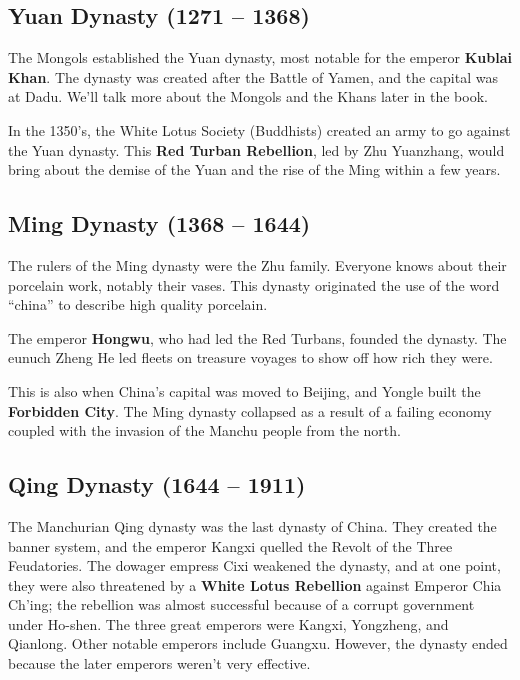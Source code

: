 \subsection*{Yuan Dynasty (1271 -- 1368)}

The Mongols established the Yuan dynasty, most notable for the emperor \textbf{Kublai Khan}.
The dynasty was created after the Battle of Yamen, and the capital was at Dadu.
We'll talk more about the Mongols and the Khans later in the book.

In the 1350's, the White Lotus Society (Buddhists) created an army to go against the Yuan dynasty.
This \textbf{Red Turban Rebellion}, led by Zhu Yuanzhang,
would bring about the demise of the Yuan and the rise of the Ming within a few years.

\subsection*{Ming Dynasty (1368 -- 1644)}

The rulers of the Ming dynasty were the Zhu family.
Everyone knows about their porcelain work, notably their vases.
This dynasty originated the use of the word ``china'' to describe high quality porcelain.

The emperor \textbf{Hongwu}, who had led the Red Turbans, founded the dynasty.
The eunuch Zheng He led fleets on treasure voyages to show off how rich they were.

This is also when China's capital was moved to Beijing,
and Yongle built the \textbf{Forbidden City}.
The Ming dynasty collapsed as a result of a failing economy
coupled with the invasion of the Manchu people from the north.

\subsection*{Qing Dynasty (1644 -- 1911)}

The Manchurian Qing dynasty was the last dynasty of China.
They created the banner system, and the emperor Kangxi quelled the Revolt of the Three Feudatories.
The dowager empress Cixi weakened the dynasty, and at one point,
they were also threatened by a \textbf{White Lotus Rebellion} against Emperor Chia Ch'ing;
the rebellion was almost successful because of a corrupt government under Ho-shen.
The three great emperors were Kangxi, Yongzheng, and Qianlong.
Other notable emperors include Guangxu.
However, the dynasty ended because the later emperors weren't very effective.

